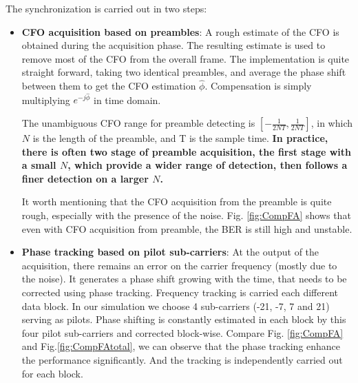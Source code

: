 \documentclass[a4paper]{article}
\begin{document}
	The synchronization is carried out in two steps:
	\begin{itemize}
		\item \textbf{CFO acquisition based on preambles}: A rough estimate of the CFO is obtained during the acquisition phase. The resulting estimate is used to remove most of the CFO from the overall frame. The implementation is quite straight forward, taking two identical preambles, and average the phase shift between them to get the CFO estimation $\hat{\phi}$. Compensation is simply multiplying $e^{-j\hat{\phi}}$ in time domain.
        
        The unambiguous CFO range for preamble detecting is $[-\frac{1}{2NT}, \frac{1}{2NT}]$, in which $N$ is the length of the preamble, and T is the sample time. \textbf{In practice, there is often two stage of preamble acquisition, the first stage with a small $N$, which provide a wider range of detection, then follows a finer detection on a larger $N$.}
        
        It worth mentioning that the CFO acquisition from the preamble is quite rough, especially with the presence of the noise. Fig. \ref{fig:CompFA} shows that even with CFO acquisition from preamble, the BER is still high and unstable.
		
		\item \textbf{Phase tracking based on pilot sub-carriers}: At the output of the acquisition, there remains an error on the carrier frequency (mostly due to the noise). It generates a phase shift growing with the time, that needs to be corrected using phase tracking. Frequency tracking is carried each different data block. In our simulation we choose 4 sub-carriers (-21, -7, 7 and 21) serving as pilots. Phase shifting is constantly estimated in each block by this four pilot sub-carriers and corrected block-wise. Compare Fig. \ref{fig:CompFA} and Fig.\ref{fig:CompFAtotal}, we can observe that the phase tracking enhance the performance significantly. And the tracking is independently carried out for each block.
		
	\end{itemize}
	
\end{document}
